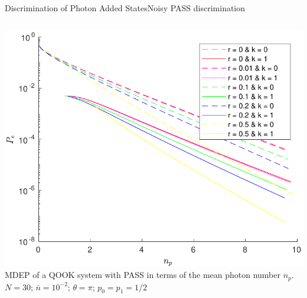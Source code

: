 \begin{frame}{Discrimination of Photon Added States}{Noisy PASS discrimination}
    \begin{columns}
        \begin{column}{0.5\linewidth}%
            \begin{center}
                \includegraphics[width=1\textwidth]{Pictures/fig3.6.pdf}\\
                \scriptsize{
                MDEP of a QOOK system with PASS in terms of the mean photon number $n_p$.\\
                $N=30$; $\bar{n}=10^{-2}$; $\theta=\pi$; $p_0=p_1=1/2$
                }
            \end{center}
        \end{column}
        

\end{columns}
\end{frame}
